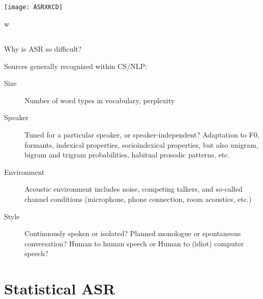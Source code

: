 \documentclass[9pt,xcolor=pdftex,dvipsnames,table]{beamer}
\begin{document}
\subsection{}
\begin{frame}{}

	\begin{center}
    \texttt{[image: ASRXKCD]}
	\end{center}
	
\end{frame}w

\subsection{}
\begin{frame}{Why is ASR so difficult?}

{\large Sources generally recognized within CS/NLP: }
\vspace{.25cm}

\begin{description}
	\item[Size] Number of word types in vocabulary, perplexity
	\vspace{.25cm}
	\item[Speaker] Tuned for a particular speaker, or speaker-independent? Adaptation to F0, formants, indexical properties, socioindexical properties, but also unigram, bigram and trigram probabilities, habitual prosodic patterns, etc.
		\vspace{.25cm}
	\item[Environment] Acoustic environment includes noise, competing talkers, and so-called channel conditions (microphone, phone connection, room acoustics, etc.)
		\vspace{.25cm}
	\item[Style] Continuously spoken or isolated? Planned monologue or spontaneous conversation?  Human to human speech or Human to (idiot) computer speech?
\end{description}

\end{frame}

\section{Statistical ASR}
\end{document}
